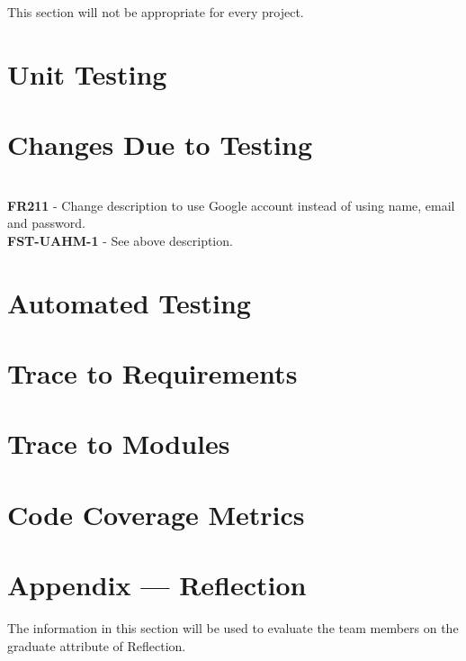 \documentclass[12pt, titlepage]{article}
\begin{document}
This section will not be appropriate for every project.

\section{Unit Testing}

\section{Changes Due to Testing}

\\
\textbf{FR211} - Change description to use Google account instead of using name, email and password.\\
\textbf{FST-UAHM-1} - See above description.

\section{Automated Testing}
		
\section{Trace to Requirements}
		
\section{Trace to Modules}		

\section{Code Coverage Metrics}




\newpage{}
\section*{Appendix --- Reflection}

The information in this section will be used to evaluate the team members on the
graduate attribute of Reflection.


\end{document}
